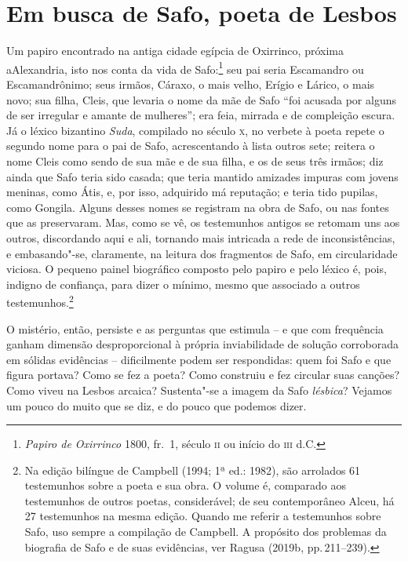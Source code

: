 \section*{Em busca de Safo, poeta de Lesbos}

Um papiro encontrado na antiga cidade egípcia de Oxirrinco, próxima a\EP[]
Alexandria, isto nos conta da vida de Safo:\footnote{\textit{Papiro de Oxirrinco} 1800,
fr.~1, século \textsc{ii} ou início do \textsc{iii} d.C.} seu pai seria Escamandro ou
Escamandrônimo; seus irmãos, Cáraxo, o mais velho, Erígio e Lárico, o mais
novo; sua filha, Cleis, que levaria o nome da mãe de Safo ``foi acusada
por alguns de ser irregular e amante de mulheres”; era feia, mirrada e de
compleição escura. Já o léxico bizantino \textit{Suda}, compilado no século \textsc{x},
no verbete à poeta repete o segundo nome para o pai de Safo, acrescentando à
lista outros sete; reitera o nome Cleis como sendo de sua mãe e de sua filha, e
os de seus três irmãos; diz ainda que Safo teria sido casada; que teria mantido
amizades impuras com jovens meninas, como Átis, e, por isso, adquirido má
reputação; e teria tido pupilas, como Gongila. Alguns desses nomes se registram
na obra de Safo, ou nas fontes que as preservaram. Mas, como se vê, os
testemunhos antigos se retomam uns aos outros, discordando aqui e ali, tornando
mais intricada a rede de inconsistências, e embasando"-se, claramente, na
leitura dos fragmentos de Safo, em circularidade viciosa. O pequeno painel
biográfico composto pelo papiro e pelo léxico é, pois, indigno de confiança,
para dizer o mínimo, mesmo que associado a outros testemunhos.\footnote{ Na
edição bilíngue de Campbell (1994; 1ª ed.: 1982), são arrolados 61 testemunhos
sobre a poeta e sua obra. O volume é, \mbox{comparado} aos testemunhos de outros
poetas, considerável; de seu contemporâneo Alceu, há 27 testemunhos na mesma edição. 
Quando me referir a testemunhos sobre Safo, uso
sempre a compilação de Campbell. A propósito dos problemas da biografia de Safo e de suas evidências, ver Ragusa (2019b, pp.\,211--239).}

O mistério, então, persiste e as perguntas que estimula -- e que com frequência
ganham dimensão desproporcional à própria inviabilidade de solução
corroborada em sólidas evidências -- dificilmente podem ser respondidas: quem
foi Safo e que figura portava? Como se fez a poeta? Como construiu e fez
circular suas canções? Como viveu na Lesbos arcaica? Sustenta"-se a imagem da
Safo \textit{lésbica}? Vejamos um pouco do muito que se diz, e do
pouco que podemos dizer.

